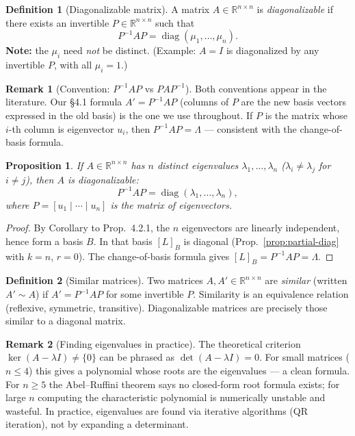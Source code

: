 \documentclass[11pt]{article}
\theoremstyle{definition}
\newtheorem{definition}{Definition}[section]
\newtheorem{remark}{Remark}[section]
\theoremstyle{plain}
\newtheorem{proposition}{Proposition}[section]
\begin{document}
\begin{definition}[Diagonalizable matrix]
  A matrix $A\in\mathbb{R}^{n\times n}$ is \emph{diagonalizable} if there
  exists an invertible $P\in\mathbb{R}^{n\times n}$ such that
  \[
    P^{-1}AP = \operatorname{diag}(\mu_1,\ldots,\mu_n).
  \]
  \textbf{Note:} the $\mu_i$ need \emph{not} be distinct.
  (Example: $A = I$ is diagonalized by any invertible $P$, with all
  $\mu_i = 1$.)
\end{definition}

\begin{remark}[Convention: $P^{-1}AP$ vs $PAP^{-1}$]
  Both conventions appear in the literature.  Our \S4.1 formula
  $A' = P^{-1}AP$ (columns of $P$ are the new basis vectors expressed in
  the old basis) is the one we use throughout.  If $P$ is the matrix whose
  $i$-th column is eigenvector $u_i$, then $P^{-1}AP = \Lambda$ —
  consistent with the change-of-basis formula.
\end{remark}

\begin{proposition}
  If $A\in\mathbb{R}^{n\times n}$ has $n$ distinct eigenvalues
  $\lambda_1,\ldots,\lambda_n$ ($\lambda_i\neq\lambda_j$ for $i\neq j$),
  then $A$ is diagonalizable:
  \[
    P^{-1}AP = \operatorname{diag}(\lambda_1,\ldots,\lambda_n),
  \]
  where $P = [u_1 \mid \cdots \mid u_n]$ is the matrix of eigenvectors.
\end{proposition}
\begin{proof}
  By Corollary to Prop.\ 4.2.1, the $n$ eigenvectors are linearly
  independent, hence form a basis $B$.  In that basis $[L]_B$ is diagonal
  (Prop.~\ref{prop:partial-diag} with $k=n$, $r=0$).  The change-of-basis
  formula gives $[L]_B = P^{-1}AP = \Lambda$.
\end{proof}

\begin{definition}[Similar matrices]
  Two matrices $A, A'\in\mathbb{R}^{n\times n}$ are \emph{similar}
  (written $A'\sim A$) if $A' = P^{-1}AP$ for some invertible $P$.
  Similarity is an equivalence relation (reflexive, symmetric, transitive).
  Diagonalizable matrices are precisely those similar to a diagonal matrix.
\end{definition}

\begin{remark}[Finding eigenvalues in practice]
  The theoretical criterion $\ker(A-\lambda I)\neq\{0\}$ can be phrased as
  $\det(A-\lambda I) = 0$.  For small matrices ($n\le 4$) this gives a
  polynomial whose roots are the eigenvalues --- a clean formula.
  For $n\ge 5$ the Abel--Ruffini theorem says no closed-form root formula
  exists; for large $n$ computing the characteristic polynomial is
  numerically unstable and wasteful.  In practice, eigenvalues are found via
  iterative algorithms (QR iteration), not by expanding a determinant.
\end{remark}
\end{document}
